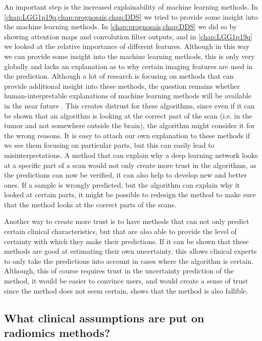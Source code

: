 An important step is the increased explainability of machine learning methods.
In \cref{chap:LGG1p19q,chap:prognosais,chap:DDS} we  tried to provide some insight into the machine learning methods.
In \cref{chap:prognosais,chap:DDS} we did so by showing attention maps and convolution filter outputs, and in \cref{chap:LGG1p19q} we looked at the relative importance of different features.
Although in this way we can provide some insight into the machine learning methods, this is only very globally and lacks an explanation as to why certain imaging features are used in the prediction.
Although a lot of research is focusing on methods that can provide additional insight into these methods, the question remains whether human-interpretable explanations of machine learning methods will be available in the near future \autocite{zhang2018interpretable}.
This creates distrust for these algorithms, since even if it can be shown that an algorithm is looking at the correct part of the scan (i.e. in the tumor and not somewhere outside the brain), the algorithm might consider it for the wrong reasons.
It is easy to attach our own explanation to these methods if we see them focusing on particular parts, but this can easily lead to misinterpretations.
A method that can explain why a deep learning network looks at a specific part of a scan would not only create more trust in the algorithms, as the predictions can now be verified, it can also help to develop new and better ones.
If a sample is wrongly predicted, but the algorithm can explain why it looked at certain parts, it might be possible to redesign the method to make sure that the method looks at the correct parts of the scans.

Another way to create more trust is to have methods that can not only predict certain clinical characteristics, but that are also able to provide the level of certainty with which they make their predictions.
If it can be shown that these methods are good at estimating their own uncertainty, this allows clinical experts to only take the predictions into account in cases where the algorithm is certain.
Although, this of course requires trust in the uncertainty prediction of the method, it would be easier to convince users, and would create a sense of trust since the method does not seem certain, shows that the method is also fallible.

\subsection{What clinical assumptions are put on radiomics methods?}

